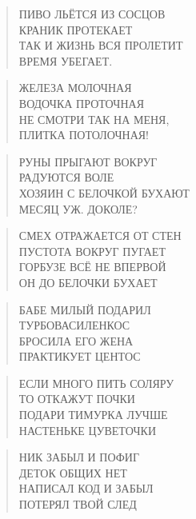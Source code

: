 \poemtitle{***}
\begin{verse}
ПИВО ЛЬЁТСЯ ИЗ СОСЦОВ\\
КРАНИК ПРОТЕКАЕТ\\
ТАК И ЖИЗНЬ ВСЯ ПРОЛЕТИТ\\
ВРЕМЯ УБЕГАЕТ.
\end{verse}

\poemtitle{***}
\begin{verse}
ЖЕЛЕЗА МОЛОЧНАЯ\\
ВОДОЧКА ПРОТОЧНАЯ\\
НЕ СМОТРИ ТАК НА МЕНЯ,\\
ПЛИТКА ПОТОЛОЧНАЯ!
\end{verse}

\poemtitle{***}
\begin{verse}
РУНЫ ПРЫГАЮТ ВОКРУГ\\
РАДУЮТСЯ ВОЛЕ\\
ХОЗЯИН С БЕЛОЧКОЙ БУХАЮТ\\
МЕСЯЦ УЖ. ДОКОЛЕ?
\end{verse}

\poemtitle{***}
\begin{verse}
СМЕХ ОТРАЖАЕТСЯ ОТ СТЕН\\
ПУСТОТА ВОКРУГ ПУГАЕТ\\
ГОРБУЗЕ ВСЁ НЕ ВПЕРВОЙ\\
ОН ДО БЕЛОЧКИ БУХАЕТ
\end{verse}

\poemtitle{***}
\begin{verse}
БАБЕ МИЛЫЙ ПОДАРИЛ\\
ТУРБОВАСИЛЕНКОС\\
БРОСИЛА ЕГО ЖЕНА\\
ПРАКТИКУЕТ ЦЕНТОС
\end{verse}

\poemtitle{***}
\begin{verse}
ЕСЛИ МНОГО ПИТЬ СОЛЯРУ\\
ТО ОТКАЖУТ ПОЧКИ\\
ПОДАРИ ТИМУРКА ЛУЧШЕ\\
НАСТЕНЬКЕ ЦУВЕТОЧКИ
\end{verse}

\poemtitle{***}
\begin{verse}
НИК ЗАБЫЛ И ПОФИГ\\
ДЕТОК ОБЩИХ НЕТ\\
НАПИСАЛ КОД И ЗАБЫЛ\\
ПОТЕРЯЛ ТВОЙ СЛЕД
\end{verse}


